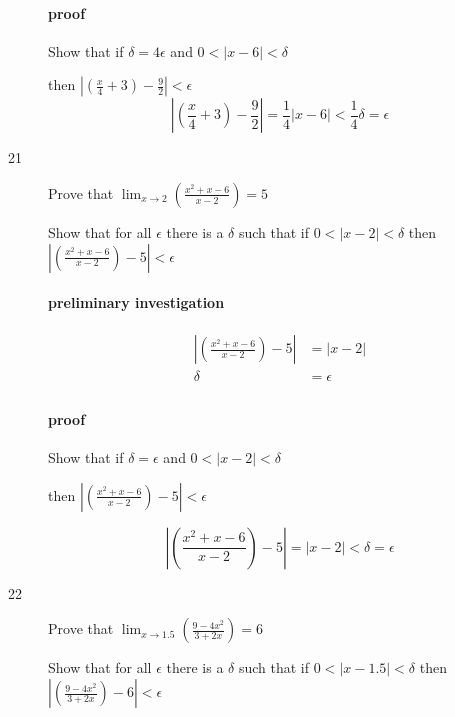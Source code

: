 \documentclass[letterpaper, landscape]{exam}
\begin{document}
\begin{description}
        \paragraph{proof}
        Show that if $\delta = 4 \epsilon$ and $0 < |x - 6| < \delta$

        then $\left| \left( \frac{x}{4} + 3 \right) - \frac{9}{2} \right| < \epsilon$
        \[
          \left| \left( \frac{x}{4} + 3 \right) - \frac{9}{2} \right| = \frac{1}{4} |x - 6| < \frac{1}{4} \delta = \epsilon
        \]

      \item[21] Prove that $\lim_{x \to 2} \left( \frac{x^2 + x - 6}{x - 2} \right) = 5$

        Show that for all $\epsilon$ there is a $\delta$ such that if 
        $0 < |x - 2| < \delta$ then $ \left| \left( \frac{x^2 + x - 6}{x - 2} \right) - 5 \right| < \epsilon$

        \paragraph{preliminary investigation}
        \begin{align*}
          \left| \left( \frac{x^2 + x - 6}{x - 2} \right) - 5 \right| & = |x - 2| \\
          \delta                                                      & = \epsilon \\
        \end{align*}

        \paragraph{proof}
        Show that if $\delta = \epsilon$ and $0 < |x - 2| < \delta$

        then $\left| \left( \frac{x^2 + x - 6}{x - 2} \right) - 5 \right| < \epsilon$

        \[
          \left| \left( \frac{x^2 + x - 6}{x - 2} \right) - 5 \right| = |x - 2| < \delta = \epsilon
        \]

      \newpage

      \item[22] Prove that $\lim_{x \to 1.5} \left( \frac{9 - 4x^2}{3 + 2x} \right) = 6$

        Show that for all $\epsilon$ there is a $\delta$ such that if 
        $0 < |x - 1.5| < \delta$ then $ \left| \left( \frac{9 - 4x^2}{3 + 2x} \right) - 6 \right| < \epsilon$


\end{description}
\end{document}
